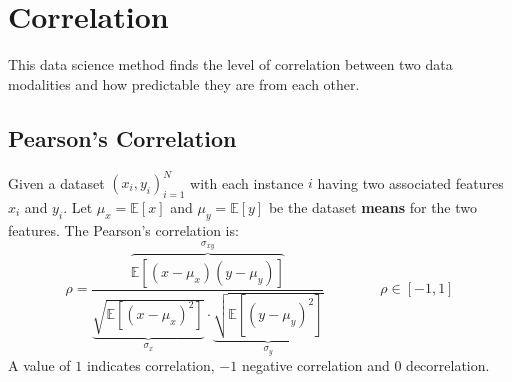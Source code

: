 \newpage
\section{Correlation}
This data science method finds the level of correlation between two data modalities and how predictable they are from each other.

\subsection{Pearson's Correlation}
Given a dataset $(x_i, y_i)^N_{i=1}$ with each instance $i$ having two associated features $x_i$ and $y_i$. Let $\mu_x = \mathbb{E}[x]$ and $\mu_y = \mathbb{E}[y]$ be the dataset \textbf{means} for the two features. The Pearson's correlation is:
\begin{equation}
	\rho = \frac{\overbrace{\mathbb{E}[(x-\mu_x)(y-\mu_y)]}^{\sigma_{xy}}}{\underbrace{\sqrt{\mathbb{E}[(x-\mu_x)^2]}}_{\sigma_x} \cdot \underbrace{\sqrt{\mathbb{E}[(y-\mu_y)^2]}}_{\sigma_y}} \qquad\qquad \rho \in [-1,1]
\end{equation}
A value of $1$ indicates correlation, $-1$ negative correlation and $0$ decorrelation.

